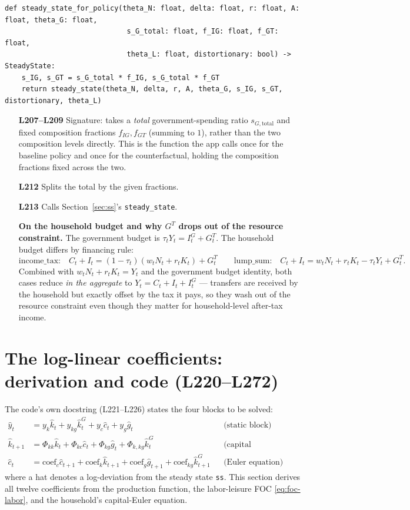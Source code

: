 \documentclass[11pt]{article}
\newcommand{\eq}[1]{\begin{equation}#1\end{equation}}
\begin{document}
\begin{lstlisting}[firstnumber=207]
def steady_state_for_policy(theta_N: float, delta: float, r: float, A: float, theta_G: float,
                             s_G_total: float, f_IG: float, f_GT: float,
                             theta_L: float, distortionary: bool) -> SteadyState:
    s_IG, s_GT = s_G_total * f_IG, s_G_total * f_GT
    return steady_state(theta_N, delta, r, A, theta_G, s_IG, s_GT, distortionary, theta_L)
\end{lstlisting}
\label{sec:policybudget}
\begin{itemize}
\item[\textbf{L207--L209}] Signature: takes a \emph{total}
government-spending ratio $s_{G,\text{total}}$ and fixed composition
fractions $f_{IG},f_{GT}$ (summing to $1$), rather than the two composition
levels directly. This is the function the app calls once for the baseline
policy and once for the counterfactual, holding the composition fractions
fixed across the two.
\item[\textbf{L212}] Splits the total by the given fractions.
\item[\textbf{L213}] Calls Section~\ref{sec:ss}'s \texttt{steady\_state}.
\item[\textbf{On the household budget and why $G^T$ drops out of the
resource constraint.}] The government budget is
$\tau_tY_t=I^G_t+G^T_t$. The household budget differs by financing rule:
\eq{
\text{income\_tax:}\quad C_t+I_t=(1-\tau_t)(w_tN_t+r_tK_t)+G^T_t
\qquad
\text{lump\_sum:}\quad C_t+I_t=w_tN_t+r_tK_t-\tau_tY_t+G^T_t.
}
Combined with $w_tN_t+r_tK_t=Y_t$ and the government budget identity, both
cases reduce \emph{in the aggregate} to $Y_t=C_t+I_t+I^G_t$ --- transfers
are received by the household but exactly offset by the tax it pays, so
they wash out of the resource constraint even though they matter for
household-level after-tax income.
\end{itemize}

\section{The log-linear coefficients: derivation and code (L220--L272)}
\label{sec:loglinear}

The code's own docstring (L221--L226) states the four blocks to be solved:
\begin{align}
\hat y_t &= y_k\hat k_t+y_{kg}\hat k^G_t+y_c\hat c_t+y_g\hat g_t &&\text{(static block)}\label{eq:static}\\
\hat k_{t+1} &= \Phi_{kk}\hat k_t+\Phi_{kc}\hat c_t+\Phi_{kg}\hat g_t+\Phi_{k,kg}\hat k^G_t &&\text{(capital accumulation)}\label{eq:capaccum}\\
\hat c_t &= \text{coef}_c\hat c_{t+1}+\text{coef}_k\hat k_{t+1}+\text{coef}_g\hat g_{t+1}+\text{coef}_{kg}\hat k^G_{t+1} &&\text{(Euler equation)}\label{eq:euler}
\end{align}
where a hat denotes a log-deviation from the steady state \texttt{ss}. This
section derives all twelve coefficients from the production function, the
labor-leisure FOC \eqref{eq:foc-labor}, and the household's capital-Euler
equation.
\end{document}
